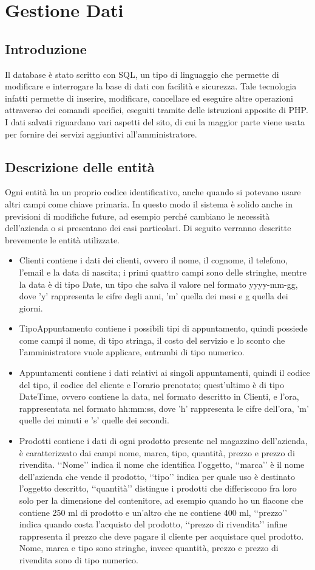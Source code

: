 \section{Gestione Dati}{
	\subsection{Introduzione}{
		Il database è stato scritto con SQL, un tipo di linguaggio che permette di modificare e interrogare la base di dati con facilità e sicurezza. Tale tecnologia infatti permette di inserire, modificare, cancellare ed eseguire altre operazioni attraverso dei comandi specifici, eseguiti tramite delle istruzioni apposite di PHP. I dati salvati riguardano vari aspetti del sito, di cui la maggior parte viene usata per fornire dei servizi aggiuntivi all'amministratore.
	}
	\subsection{Descrizione delle entità}{
		Ogni entità ha un proprio codice identificativo, anche quando si potevano usare altri campi come chiave primaria. In questo modo il sistema è solido anche in previsioni di modifiche future, ad esempio perché cambiano le necessità dell'azienda o si presentano dei casi particolari. Di seguito verranno descritte brevemente le entità utilizzate.
		\begin{itemize}
		\item Clienti contiene i dati dei clienti, ovvero il nome, il cognome, il telefono, l'email e la data di nascita; i primi quattro campi sono delle stringhe, mentre la data è di tipo Date, un tipo che salva il valore nel formato yyyy-mm-gg, dove 'y' rappresenta le cifre degli anni, 'm' quella dei mesi e g quella dei giorni.
		\item TipoAppuntamento contiene i possibili tipi di appuntamento, quindi possiede come campi il nome, di tipo stringa, il costo del servizio e lo sconto che l'amministratore vuole applicare, entrambi di tipo numerico.
		\item Appuntamenti contiene i dati relativi ai singoli appuntamenti, quindi il codice del tipo, il codice del cliente e l'orario prenotato; quest'ultimo è di tipo DateTime, ovvero contiene la data, nel formato descritto in Clienti, e l'ora, rappresentata nel formato hh:mm:ss, dove 'h' rappresenta le cifre dell'ora, 'm' quelle dei minuti e 's' quelle dei secondi.
		\item Prodotti contiene i dati di ogni prodotto presente nel magazzino dell'azienda, è caratterizzato dai campi nome, marca, tipo, quantità, prezzo e prezzo di rivendita. ‘‘Nome’’ indica il nome che identifica l'oggetto, ‘‘marca’’ è il nome dell'azienda che vende il prodotto, ‘‘tipo’’ indica per quale uso è destinato l'oggetto descritto, ‘‘quantità’’ distingue i prodotti che differiscono fra loro solo per la dimensione del contenitore, ad esempio quando ho un flacone che contiene 250 ml di prodotto e un'altro che ne contiene 400 ml, ‘‘prezzo’’ indica quando costa l'acquisto del prodotto, ‘‘prezzo di rivendita’’ infine rappresenta il prezzo che deve pagare il cliente per acquistare quel prodotto. Nome, marca e tipo sono stringhe, invece quantità, prezzo e prezzo di rivendita sono di tipo numerico. 

\end{itemize}}}
